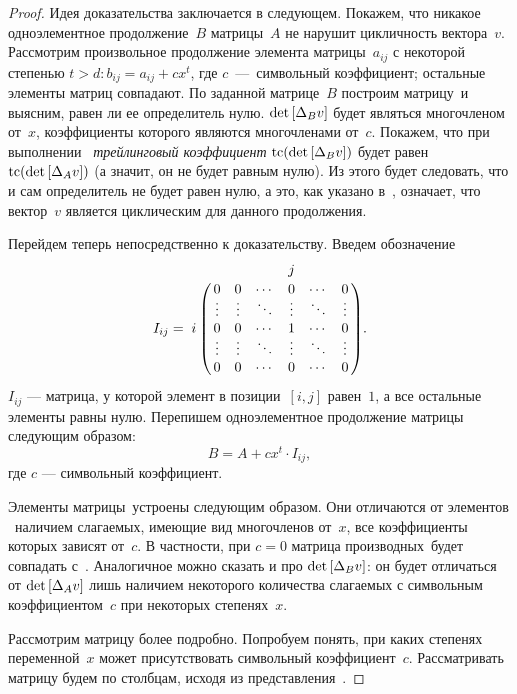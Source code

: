 \begin{proof}

Идея доказательства заключается в следующем.
Покажем, что никакое одноэлементное продолжение~$B$ матрицы~$A$ не нарушит цикличность вектора~$v$.
Рассмотрим произвольное продолжение элемента матрицы~$a_{ij}$ с некоторой степенью $t > d: b_{ij} = a_{ij} + cx^t$,
где $c$~---~символьный коэффициент; остальные элементы матриц совпадают.
По заданной матрице~$B$ построим матрицу~\diffMatrix[B] и выясним, равен ли ее определитель нулю.
$\mathop{\rm det} \text{$ [\Delta_B v] $}$ будет являться многочленом от~$x$, коэффициенты которого являются многочленами от~$c$.
Покажем, что при выполнении~ \textit{трейлинговый коэффициент} $\mathop{\rm tc} (\mathop{\rm det} \text{$ [\Delta_B v] $})$ будет равен $\mathop{\rm tc} (\mathop{\rm det} \text{$ [\Delta_A v] $})$
(а значит, он не будет равным нулю).
Из этого будет следовать, что и сам определитель не будет равен нулю, а это, как указано в~, означает, что вектор~$v$ является циклическим для данного продолжения.
\medskip

Перейдем теперь непосредственно к доказательству.
Введем обозначение
\begin{equation*}
	I_{ij} = 
	\bordermatrix{
		&           &         &        & j      &        &        \cr
		&   0       & 0       & \cdots & 0      & \cdots & 0      \cr
		&   \vdots  & \vdots  & \ddots & \vdots & \ddots & \vdots \cr
		i & 0       & 0       & \cdots & 1      & \cdots & 0      \cr
		&   \vdots  & \vdots  & \ddots & \vdots & \ddots & \vdots \cr
		&   0       & 0       & \cdots & 0      & \cdots & 0      \cr
	}.
\end{equation*}
$I_{ij}$ --- матрица, у которой элемент в позиции~$[i, j]$ равен~$1$, а все остальные элементы равны нулю.
Перепишем одноэлементное продолжение матрицы следующим образом:
\begin{equation}
	B = A + cx^t \cdot I_{ij},
\end{equation}
где $c$ --- символьный коэффициент.

Элементы матрицы~\diffMatrix[B] устроены следующим образом.
Они отличаются от элементов \diffMatrix\ наличием слагаемых, имеющие вид многочленов от~$x$, все коэффициенты которых зависят от~$c$.
В частности, при $c = 0$ матрица производных~\diffMatrix[B] будет совпадать с~\diffMatrix.
Аналогичное можно сказать и про $\mathop{\rm det} \text{$ [\Delta_B v] $}$: он будет отличаться от $\mathop{\rm det} \text{$ [\Delta_A v] $}$ 
лишь наличием некоторого количества слагаемых с символьным коэффициентом~$c$ при некоторых степенях~$x$.
\medskip

Рассмотрим матрицу \diffMatrix[B] более подробно. Попробуем понять, при каких степенях переменной~$x$ может присутствовать символьный коэффициент~$c$.
Рассматривать матрицу будем по столбцам, исходя из представления~.


\end{proof}
